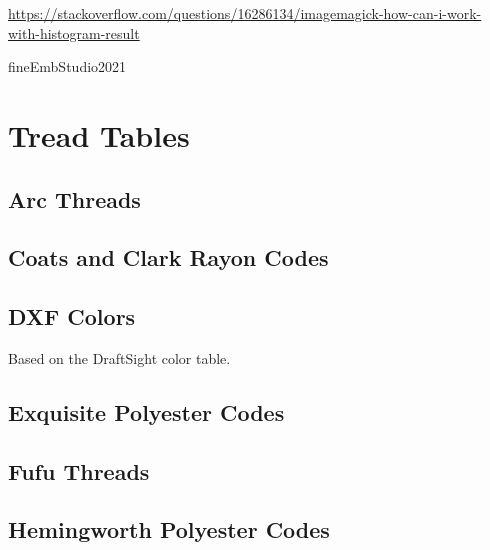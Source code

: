\documentclass[10pt]{report}
\begin{document}
\url{https://stackoverflow.com/questions/16286134/imagemagick-how-can-i-work-with-histogram-result}

fineEmbStudio2021




\appendix

\chapter{Tread Tables}

\section{Arc Threads}

%

%

\section{Coats and Clark Rayon Codes}

%

\section{DXF Colors}

Based on the DraftSight color table.

%

\section{Exquisite Polyester Codes}

%

\section{Fufu Threads}

%

%

\section{Hemingworth Polyester Codes}
\end{document}
